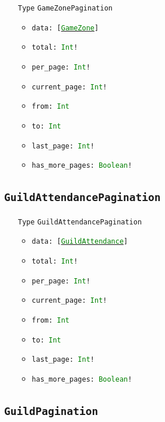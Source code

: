 \documentclass[10pt, a4paper]{memoir}
\numberwithin{equation}{section}
\theoremstyle{plain}
\theoremstyle{defp}
\theoremstyle{dotless}
\theoremstyle{definition}
\theoremstyle{dotless}
\theoremstyle{dotless}
\theoremstyle{defp}
\theoremstyle{defp}
\theoremstyle{be}          %
\theoremstyle{defp}
\newcommand\ttt[1]{\texttt{#1}}
\newcommand\type[1]{\ttt{\textcolor{green}{#1}}}
\begin{document}
\begin{itemize}[noitemsep,topsep=1pt]
\item[\ttt{Type}] \ttt{GameZonePagination}
\begin{itemize}[itemsep=1pt,topsep=1pt]
\item \ttt{data: [\hyperref[sec:GameZone]{\type{GameZone}}]}
\item \ttt{total: \type{Int}!}
\item \ttt{per\_page: \type{Int}!}
\item \ttt{current\_page: \type{Int}!}
\item \ttt{from: \type{Int}}
\item \ttt{to: \type{Int}}
\item \ttt{last\_page: \type{Int}!}
\item \ttt{has\_more\_pages: \type{Boolean}!}
\end{itemize}
\end{itemize}

\subsection{\ttt{GuildAttendancePagination}}\label{sec:guildattendancepagination}

\begin{itemize}[noitemsep,topsep=1pt]
\item[\ttt{Type}] \ttt{GuildAttendancePagination}
\begin{itemize}[itemsep=1pt,topsep=1pt]
\item \ttt{data: [\hyperref[sec:GuildAttendance]{\type{GuildAttendance}}]}
\item \ttt{total: \type{Int}!}
\item \ttt{per\_page: \type{Int}!}
\item \ttt{current\_page: \type{Int}!}
\item \ttt{from: \type{Int}}
\item \ttt{to: \type{Int}}
\item \ttt{last\_page: \type{Int}!}
\item \ttt{has\_more\_pages: \type{Boolean}!}
\end{itemize}
\end{itemize}

\subsection{\ttt{GuildPagination}}\label{sec:guildpagination}
\end{document}

